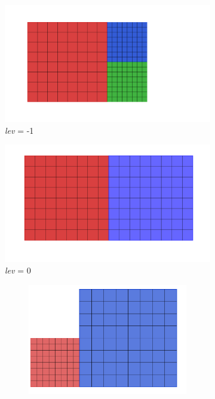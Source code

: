 \begin{figure}[H]
	\centering
	\begin{subfigure}{0.5\textwidth}
		\centering
		\includegraphics[width=0.7\linewidth]{Immagini/lev_less1.png}
		\caption{\textit{lev} = -1\newline}
		\label{fig:test1}
	\end{subfigure}%
	\begin{subfigure}{0.5\textwidth}
		\centering
		\includegraphics[width=0.7\linewidth]{Immagini/lev0.png}
		\caption{\textit{lev} = 0\newline}
		\label{fig:test2}
	\end{subfigure}
	\begin{subfigure}{0.7\textwidth}
		\centering
		\begin{subfigure}{0.5\textwidth}
			\centering
			\includegraphics[width=0.5\linewidth]{Immagini/bloccomaggiore1.png}
		\end{subfigure}%
		\begin{subfigure}{0.5\textwidth}
			\centering

\end{subfigure}
\end{subfigure}
\end{figure}
